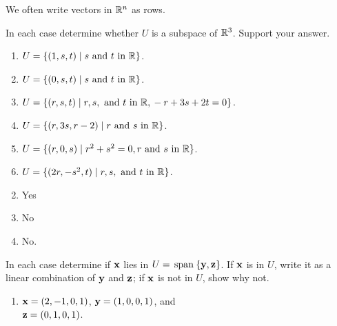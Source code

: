\begin{multicols}{2}
{\small \noindent We often write vectors in $\mathbb{R}^n$ as rows.}

\begin{ex}
In each case determine whether $U$ is a subspace of $\mathbb{R}^3$. Support your answer.

\begin{enumerate}[label={\alph*.}]
\item $U = \{(1, s, t) \mid s \mbox{ and }t \mbox{ in }\mathbb{R}\}$.

\item $U = \{(0, s, t) \mid s \mbox{ and } t \mbox{ in } \mathbb{R}\}$.

\item $U = \{(r, s, t) \mid r, s,\mbox{ and } t \mbox{ in } \mathbb{R}, \\
 -r + 3s + 2t = 0\}$.

\item $U = \{(r, 3s, r - 2) \mid r \mbox{ and } s \mbox{ in } \mathbb{R}\}$.

\item $U = \{(r, 0, s) \mid r^{2} + s^{2} = 0, r \mbox{ and } s \mbox{ in } \mathbb{R}\}$.

\item $U = \{(2r, -s^{2}, t) \mid r,  s, \mbox{ and } t \mbox{ in } \mathbb{R}\}$.

\end{enumerate}
\begin{sol}
\begin{enumerate}[label={\alph*.}]
\setcounter{enumi}{1}
\item  Yes

\setcounter{enumi}{3}
\item  No

\setcounter{enumi}{5}
\item  No.

\end{enumerate}
\end{sol}
\end{ex}

\begin{ex}
In each case determine if $\textbf{x}$ lies in $U = \thinspace\operatorname{span\medspace}\{\textbf{y}, \textbf{z}\}$. If $\textbf{x}$ is in $U$, write it as a linear combination of $\textbf{y}$ and $\textbf{z}$; if $\textbf{x}$ is not in $U$, show why not.

\begin{enumerate}[label={\alph*.}]
\item $\textbf{x} = (2, -1, 0, 1)$, $\textbf{y} = (1, 0, 0, 1)$, and \\$\textbf{z} = (0, 1, 0, 1)$.


\end{enumerate}
\end{ex}
\end{multicols}
